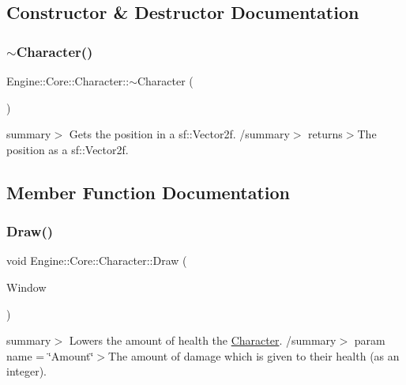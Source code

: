 \subsection{Constructor \& Destructor Documentation}
\mbox{\label{class_engine_1_1_core_1_1_character_a0377de26714b79374d0591ca44c77fd1}} 
\subsubsection{\texorpdfstring{$\sim$\+Character()}{~Character()}}
{\footnotesize\ttfamily Engine\+::\+Core\+::\+Character\+::$\sim$\+Character (\begin{DoxyParamCaption}{ }\end{DoxyParamCaption})}

summary$>$ Gets the position in a sf\+::\+Vector2f. /summary$>$ returns$>$The position as a sf\+::\+Vector2f.

\subsection{Member Function Documentation}
\mbox{\label{class_engine_1_1_core_1_1_character_ae25a76e7497eeb6dbd1ad3b72c1ff721}} 
\subsubsection{\texorpdfstring{Draw()}{Draw()}}
{\footnotesize\ttfamily void Engine\+::\+Core\+::\+Character\+::\+Draw (\begin{DoxyParamCaption}\item[{Render\+Window $\ast$}]{Window }\end{DoxyParamCaption})}

summary$>$ Lowers the amount of health the \hyperlink{class_engine_1_1_core_1_1_character}{Character}. /summary$>$ param name = \char`\"{}\+Amount\char`\"{}$>$The amount of damage which is given to their health (as an integer).\mbox{\label{class_engine_1_1_core_1_1_character_afff37c4ff688837f42509f721853bab8}} 
